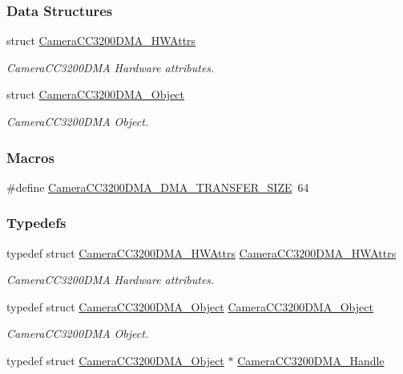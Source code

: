 \subsubsection*{Data Structures}
\begin{DoxyCompactItemize}
\item 
struct \hyperlink{struct_camera_c_c3200_d_m_a___h_w_attrs}{Camera\+C\+C3200\+D\+M\+A\+\_\+\+H\+W\+Attrs}
\begin{DoxyCompactList}\small\item\em Camera\+C\+C3200\+D\+M\+A Hardware attributes. \end{DoxyCompactList}\item 
struct \hyperlink{struct_camera_c_c3200_d_m_a___object}{Camera\+C\+C3200\+D\+M\+A\+\_\+\+Object}
\begin{DoxyCompactList}\small\item\em Camera\+C\+C3200\+D\+M\+A Object. \end{DoxyCompactList}\end{DoxyCompactItemize}
\subsubsection*{Macros}
\begin{DoxyCompactItemize}
\item 
\#define \hyperlink{_camera_c_c3200_d_m_a_8h_ab83832dd54fc327b373b899cdd81a996}{Camera\+C\+C3200\+D\+M\+A\+\_\+\+D\+M\+A\+\_\+\+T\+R\+A\+N\+S\+F\+E\+R\+\_\+\+S\+I\+Z\+E}~64
\end{DoxyCompactItemize}
\subsubsection*{Typedefs}
\begin{DoxyCompactItemize}
\item 
typedef struct \hyperlink{struct_camera_c_c3200_d_m_a___h_w_attrs}{Camera\+C\+C3200\+D\+M\+A\+\_\+\+H\+W\+Attrs} \hyperlink{_camera_c_c3200_d_m_a_8h_ac8f05153a8b7346f53847068a9a6c842}{Camera\+C\+C3200\+D\+M\+A\+\_\+\+H\+W\+Attrs}
\begin{DoxyCompactList}\small\item\em Camera\+C\+C3200\+D\+M\+A Hardware attributes. \end{DoxyCompactList}\item 
typedef struct \hyperlink{struct_camera_c_c3200_d_m_a___object}{Camera\+C\+C3200\+D\+M\+A\+\_\+\+Object} \hyperlink{_camera_c_c3200_d_m_a_8h_a99f27056af98d8526508b92309c74852}{Camera\+C\+C3200\+D\+M\+A\+\_\+\+Object}
\begin{DoxyCompactList}\small\item\em Camera\+C\+C3200\+D\+M\+A Object. \end{DoxyCompactList}\item 
typedef struct \hyperlink{struct_camera_c_c3200_d_m_a___object}{Camera\+C\+C3200\+D\+M\+A\+\_\+\+Object} $\ast$ \hyperlink{_camera_c_c3200_d_m_a_8h_a7f08041f20a289608a4077c1ae6e7bd9}{Camera\+C\+C3200\+D\+M\+A\+\_\+\+Handle}
\end{DoxyCompactItemize}
